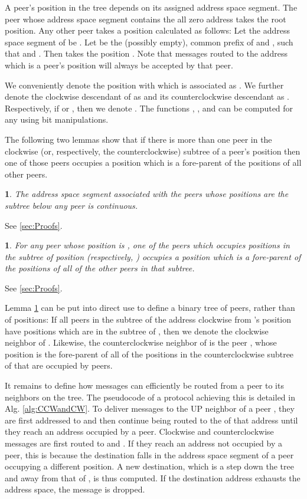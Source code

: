 \documentclass[12pt,english,journal]{elsarticle}
\makeatletter
\numberwithin{equation}{section}
\numberwithin{figure}{section}
\theoremstyle{plain}
\theoremstyle{plain}
\newtheorem{lem}[thm]{\protect\lemmaname}
\newenvironment{proof}[1][\protect\proofname]{\par
\normalfont\topsep6\p@\@plus6\p@\relax
\trivlist
\itemindent\parindent
\item[\hskip\labelsep
\scshape
#1]\ignorespaces
}{\endtrivlist\@endpefalse
}
\providecommand{\proofname}{Proof}
\providecommand{\lemmaname}{Lemma}
\makeatother
\begin{document}
A peer's position in the tree depends on its assigned address space
segment. The peer whose address space segment contains the all zero
address takes the root position. Any other peer takes a position calculated
as follows: Let the address space segment of  be .
Let  be the (possibly empty), common prefix of  and
, such that  and . Then 
takes the position . Note that messages routed to the address
which is a peer's position will always be accepted by that peer. 

We conveniently denote the position with which  is associated
as . We further denote the clockwise descendant of 
as  and its counterclockwise descendant as
. Respectively, if 
or , then we denote .
The functions , , and  can be computed for any 
using bit manipulations. 

The following two lemmas show that if there is more than one peer
in the clockwise (or, respectively, the counterclockwise) subtree
of a peer's position then one of those peers occupies a position which
is a fore-parent of the positions of all other peers.
\begin{lem}
\label{lem:continuous}The address space segment associated with the
peers whose positions are the subtree below any peer  is continuous.\end{lem}
\begin{proof}
See \ref{sec:Proofs}.\end{proof}
\begin{lem}
\label{lem:singularDescendant}For any peer  whose position
is , one of the peers which occupies positions in the subtree
of position  (respectively, )
occupies a position which is a fore-parent of the positions of all
of the other peers in that subtree.\end{lem}
\begin{proof}
See \ref{sec:Proofs}.
\end{proof}


Lemma \ref{lem:singularDescendant} can be put into direct use to
define a binary tree of peers, rather than of positions: If all peers
in the subtree of the address clockwise from 's position have
positions which are in the subtree of , then we denote 
the clockwise neighbor of . Likewise, the counterclockwise
neighbor of  is the peer , whose position is the
fore-parent of all of the positions in the counterclockwise subtree
of  that are occupied by peers. 

It remains to define how messages can efficiently be routed from a
peer to its neighbors on the tree. The pseudocode of a protocol achieving
this is detailed in Alg. \ref{alg:CCWandCW}. To deliver messages
to the UP neighbor of a peer , they are first addressed to
 and then continue being routed to the 
of that address until they reach an address occupied by a peer. Clockwise
and counterclockwise messages are first routed to 
and . If they reach an address not occupied
by a peer, this is because the destination falls in the address space
segment of a peer  occupying a different position. A new destination,
which is a step down the tree and away from that of , is
thus computed. If the destination address exhausts the address space,
the message is dropped.
\end{document}
